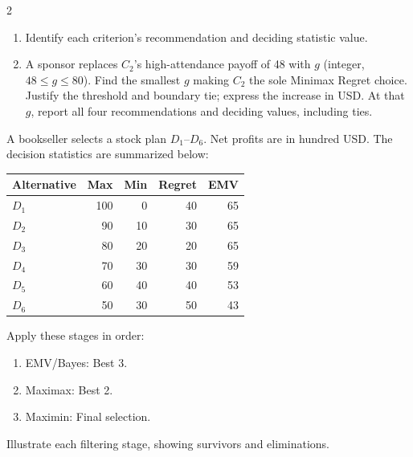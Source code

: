 \begin{multicols}{2}
		\begin{enumerate}[label=\textbf{(\alph*)},leftmargin=*]
			\item Identify each criterion's recommendation and deciding statistic value. 
			
			\item A sponsor replaces $C_2$'s high-attendance payoff of 48 with $g$ (integer, $48\leq g\leq80$). Find the smallest $g$ making $C_2$ the sole Minimax Regret choice. Justify the threshold and boundary tie; express the increase in USD. At that $g$, report all four recommendations and deciding values, including ties. 
		\end{enumerate}
		
		
		A bookseller selects a stock plan $D_1$--$D_6$. Net profits are in hundred USD. The decision statistics are summarized below:
		
		\vspace{-3mm}
		\begin{center}\small\setlength{\tabcolsep}{4pt}
			\begin{tabular}{lrrrr}\toprule
				Alternative & Max & Min & Regret & EMV\\ \midrule
				$D_1$ & 100 & 0 & 40 & 65\\
				$D_2$ & 90 & 10 & 30 & 65\\
				$D_3$ & 80 & 20 & 20 & 65\\
				$D_4$ & 70 & 30 & 30 & 59\\
				$D_5$ & 60 & 40 & 40 & 53\\
				$D_6$ & 50 & 30 & 50 & 43\\
				\bottomrule
			\end{tabular}
		\end{center}
		\vspace{-3mm}
		
		Apply these stages in order:
		\begin{enumerate}[leftmargin=*]
			\item EMV/Bayes: Best 3.
			\item Maximax: Best 2.
			\item Maximin: Final selection.
		\end{enumerate}
		Illustrate each filtering stage, showing survivors and eliminations.
		

\end{multicols}

